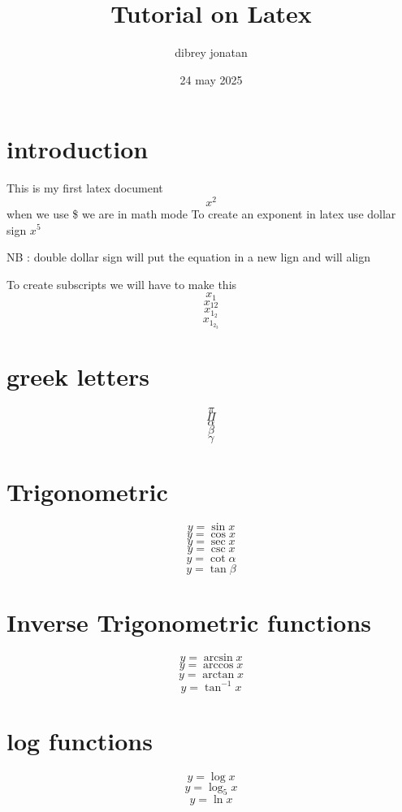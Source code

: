 \documentclass[12pt]{article}
\title{ Tutorial on Latex}
\author{ dibrey jonatan}
\date{24 may 2025}
\begin{document}
\maketitle
\section{introduction}
This is my first latex document
$$ x^2$$
when we use \$ we are in math mode
To create an exponent in latex use dollar sign
$x^5$

NB : double dollar sign will put the equation in a new lign and will align 

To create subscripts we will have to make this 
$$x_1$$
$$x_{12}$$
$$x_{1_2}$$
$$x_{1_{2_3}}$$
\maketitle
\section{greek letters}
$$\pi$$
$$\Pi$$
$$\alpha$$
$$\beta$$
$$\gamma$$
\maketitle
\section{Trigonometric}
$$ y=\sin x $$
$$ y=\cos x $$
$$ y=\sec x $$
$$ y=\csc x $$
$$ y=\cot \alpha $$
$$ y=\tan \beta $$
\maketitle
\section{Inverse Trigonometric functions}
$$ y=\arcsin x $$
$$ y=\arccos x $$
$$ y=\arctan x$$
$$ y=\tan^{-1} x$$
\maketitle
\section{log functions}
$$y=\log x$$
$$ y=\log_5 x $$
$$ y=\ln x $$
\maketitle
\end{document}
